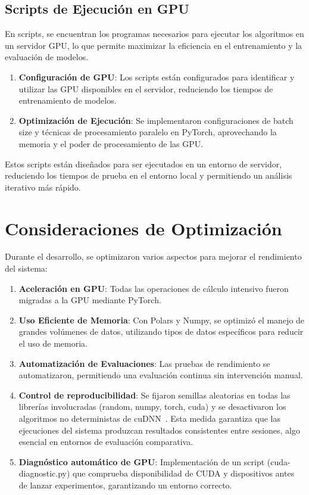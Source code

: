 \subsection{Scripts de Ejecución en GPU}\label{subsec:scripts-de-ejecucion-en-gpu}
En scripts, se encuentran los programas necesarios para ejecutar los algoritmos en un servidor GPU, lo que permite
maximizar la eficiencia en el entrenamiento y la evaluación de modelos.
\begin{enumerate}
      \item \textbf{Configuración de GPU}: Los scripts están configurados para identificar y utilizar las GPU disponibles
            en el servidor, reduciendo los tiempos de entrenamiento de modelos.
      \item \textbf{Optimización de Ejecución}: Se implementaron configuraciones de batch size y técnicas de
            procesamiento paralelo en PyTorch, aprovechando la memoria y el poder de procesamiento de las GPU\@.
\end{enumerate}

Estos scripts están diseñados para ser ejecutados en un entorno de servidor, reduciendo los tiempos de prueba en el
entorno local y permitiendo un análisis iterativo más rápido.


\section{Consideraciones de Optimización}\label{sec:consideraciones-de-optimizacion}
Durante el desarrollo, se optimizaron varios aspectos para mejorar el rendimiento del sistema:

\begin{enumerate}
      \item \textbf{Aceleración en GPU}: Todas las operaciones de cálculo intensivo fueron migradas a la GPU mediante
            PyTorch.
      \item \textbf{Uso Eficiente de Memoria}: Con Polars y Numpy, se optimizó el manejo de grandes volúmenes de datos,
            utilizando tipos de datos específicos para reducir el uso de memoria.
      \item \textbf{Automatización de Evaluaciones}: Las pruebas de rendimiento se automatizaron, permitiendo una
            evaluación continua sin intervención manual.
      \item \textbf{Control de reproducibilidad}: Se fijaron semillas aleatorias en todas las librerías involucradas
            (random, numpy, torch, cuda) y se desactivaron los algoritmos no deterministas de cuDNN~\cite{CuBLASDeterministicAlgorithms}.
            Esta medida garantiza que las ejecuciones del sistema produzcan resultados consistentes entre sesiones,
            algo esencial en entornos de evaluación comparativa.
      \item \textbf{Diagnóstico automático de GPU}: Implementación de un script (cuda-diagnostic.py) que comprueba disponibilidad
            de CUDA y dispositivos antes de lanzar experimentos, garantizando un entorno correcto.
\end{enumerate}

